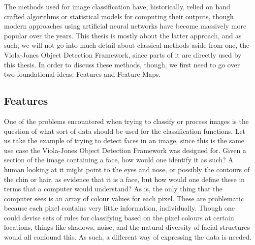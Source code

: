 \documentclass[11pt,a4paper,oldfontcommands]{memoir}
\begin{document}
The methods used for image classification have, historically, relied on hand crafted algorithms or statistical models for computing their outputs, though modern approaches using artificial neural networks have become massively more popular over the years. This thesis is mostly about the latter approach, and as such, we will not go into much detail about classical methods aside from one, the Viola-Jones Object Detection Framework, since parts of it are directly used by this thesis. In order to discuss these methods, though, we first need to go over two foundational ideas: Features and Feature Maps.

\subsection{Features}
One of the problems encountered when trying to classify or process images is the question of what sort of data should be used for the classification functions. Let us take the example of trying to detect faces in an image, since this is the same use case the Viola-Jones Object Detection Framework was designed for. Given a section of the image containing a face, how would one identify it as such? A human looking at it might point to the eyes and nose, or possibly the contours of the chin or hair, as evidence that it is a face, but how would one define these in terms that a computer would understand? As is, the only thing that the computer sees is an array of colour values for each pixel. These are problematic because each pixel contains very little information, individually. Though one could devise sets of rules for classifying based on the pixel colours at certain locations, things like shadows, noise, and the natural diversity of facial structures would all confound this. As such, a different way of expressing the data is needed.
\end{document}
